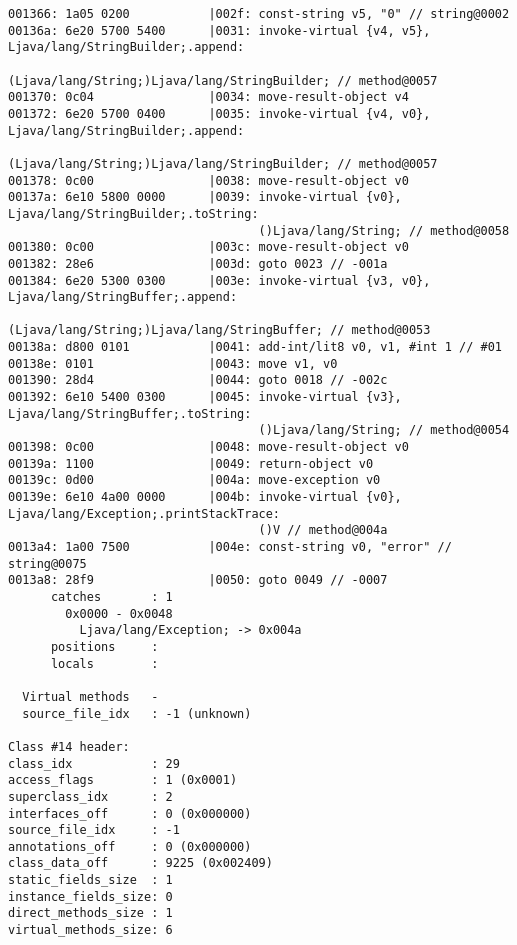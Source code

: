 \begin{lstlisting}
001366: 1a05 0200           |002f: const-string v5, "0" // string@0002
00136a: 6e20 5700 5400      |0031: invoke-virtual {v4, v5}, Ljava/lang/StringBuilder;.append:
                                   (Ljava/lang/String;)Ljava/lang/StringBuilder; // method@0057
001370: 0c04                |0034: move-result-object v4
001372: 6e20 5700 0400      |0035: invoke-virtual {v4, v0}, Ljava/lang/StringBuilder;.append:
                                   (Ljava/lang/String;)Ljava/lang/StringBuilder; // method@0057
001378: 0c00                |0038: move-result-object v0
00137a: 6e10 5800 0000      |0039: invoke-virtual {v0}, Ljava/lang/StringBuilder;.toString:
                                   ()Ljava/lang/String; // method@0058
001380: 0c00                |003c: move-result-object v0
001382: 28e6                |003d: goto 0023 // -001a
001384: 6e20 5300 0300      |003e: invoke-virtual {v3, v0}, Ljava/lang/StringBuffer;.append:
                                   (Ljava/lang/String;)Ljava/lang/StringBuffer; // method@0053
00138a: d800 0101           |0041: add-int/lit8 v0, v1, #int 1 // #01
00138e: 0101                |0043: move v1, v0
001390: 28d4                |0044: goto 0018 // -002c
001392: 6e10 5400 0300      |0045: invoke-virtual {v3}, Ljava/lang/StringBuffer;.toString:
                                   ()Ljava/lang/String; // method@0054
001398: 0c00                |0048: move-result-object v0
00139a: 1100                |0049: return-object v0
00139c: 0d00                |004a: move-exception v0
00139e: 6e10 4a00 0000      |004b: invoke-virtual {v0}, Ljava/lang/Exception;.printStackTrace:
                                   ()V // method@004a
0013a4: 1a00 7500           |004e: const-string v0, "error" // string@0075
0013a8: 28f9                |0050: goto 0049 // -0007
      catches       : 1
        0x0000 - 0x0048
          Ljava/lang/Exception; -> 0x004a
      positions     :
      locals        :

  Virtual methods   -
  source_file_idx   : -1 (unknown)

Class #14 header:
class_idx           : 29
access_flags        : 1 (0x0001)
superclass_idx      : 2
interfaces_off      : 0 (0x000000)
source_file_idx     : -1
annotations_off     : 0 (0x000000)
class_data_off      : 9225 (0x002409)
static_fields_size  : 1
instance_fields_size: 0
direct_methods_size : 1
virtual_methods_size: 6


\end{lstlisting}
